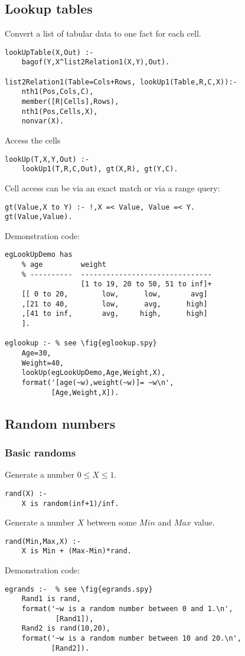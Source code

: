 \subsection{ Lookup tables
}
\label{sec:lookuptables}
Convert a list of tabular data to one
fact for each cell.
\begin{Verbatim}
lookUpTable(X,Out) :-
    bagof(Y,X^list2Relation1(X,Y),Out).

list2Relation1(Table=Cols+Rows, lookUp1(Table,R,C,X)):-
    nth1(Pos,Cols,C),
    member([R|Cells],Rows),
    nth1(Pos,Cells,X),
    nonvar(X).
\end{Verbatim}
Access the cells 
\begin{Verbatim}
lookUp(T,X,Y,Out) :-
    lookUp1(T,R,C,Out), gt(X,R), gt(Y,C).
\end{Verbatim}
Cell access can be via an exact match or
via a range query:
\begin{Verbatim}
gt(Value,X to Y) :- !,X =< Value, Value =< Y.
gt(Value,Value).
\end{Verbatim}
Demonstration code:
\begin{Verbatim}
egLookUpDemo has
    % age         weight
    % ----------  -------------------------------
                  [1 to 19, 20 to 50, 51 to inf]+
    [[ 0 to 20,        low,      low,       avg]
    ,[21 to 40,        low,      avg,      high]
    ,[41 to inf,       avg,     high,      high]
    ].

eglookup :- % see \fig{eglookup.spy}
    Age=30,
    Weight=40,
    lookUp(egLookUpDemo,Age,Weight,X),
    format('[age(~w),weight(~w)]= ~w\n',
           [Age,Weight,X]).
\end{Verbatim}
\subsection{ Random numbers
}
\subsubsection{ Basic randoms
}
\label{sec:rands}
Generate a number $0 \le X \le 1$.
\begin{Verbatim}
rand(X) :- 
    X is random(inf+1)/inf.
\end{Verbatim}
Generate a number $X$ between  some $Min$ and
$Max$ value.
\begin{Verbatim}
rand(Min,Max,X) :- 
    X is Min + (Max-Min)*rand.
\end{Verbatim}
Demonstration code:
\begin{Verbatim}
egrands :-  % see \fig{egrands.spy}
    Rand1 is rand, 
    format('~w is a random number between 0 and 1.\n',
            [Rand1]),
    Rand2 is rand(10,20),
    format('~w is a random number between 10 and 20.\n',
           [Rand2]).
\end{Verbatim}           

